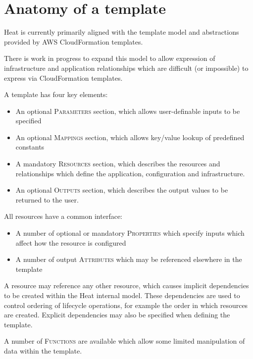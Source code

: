 \section{Anatomy of a template}

Heat is currently primarily aligned with the template model and abstractions provided by AWS CloudFormation templates.

There is work in progress to expand this model to allow expression of infrastructure and application relationships which are difficult (or impossible) to express via CloudFormation templates.

A template has four key elements:
\begin{itemize}
\item An optional \textsc{Parameters} section, which allows user-definable inputs to be specified
\item An optional \textsc{Mappings} section, which allows key/value lookup of predefined constants
\item A mandatory \textsc{Resources} section, which describes the resources and relationships which define the application, configuration and infrastructure.
\item An optional \textsc{Outputs} section, which describes the output values to be returned to the user.
\end{itemize}

All resources have a common interface:

\begin{itemize}
\item A number of optional or mandatory \textsc{Properties} which specify inputs which affect how the resource is configured
\item A number of output \textsc{Attributes} which may be referenced elsewhere in the template
\end{itemize}

A resource may reference any other resource, which causes implicit dependencies to be created within the Heat internal model.  These dependencies are used to control ordering of lifecycle operations, for example the order in which resources are created.  Explicit dependencies may also be specified when defining the template.

A number of \textsc{Functions} are available which allow some limited manipulation of data within the template.

